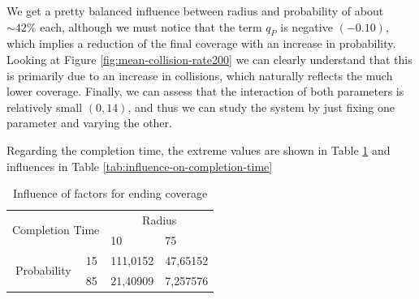 We get a pretty balanced influence between radius and probability of about $\sim 42\%$ each, although we must notice that the term $q_P$ is negative $(-0.10)$, which implies a reduction of the final coverage with an increase in probability. Looking at Figure \ref{fig:mean-collision-rate200} we can clearly understand that this is primarily due to an increase in collisions, which naturally reflects the much lower coverage. Finally, we can assess that the interaction of both parameters is relatively small $(0,14)$, and thus we can study the system by just fixing one parameter and varying the other.

Regarding the completion time, the extreme values are shown in Table \ref{tab:extreme-factors-on-completion-time} and influences in Table \ref{tab:influence-on-completion-time}

\begin{table}[H]
\centering
\begin{tabular}{|cl|rr|}
\hline
\multicolumn{2}{|c|}{\multirow{2}{*}{Completion Time}}  & \multicolumn{2}{c|}{Radius}                             \\ \cline{3-4} 
\multicolumn{2}{|c|}{}                                  & \multicolumn{1}{l|}{10}       & \multicolumn{1}{l|}{75} \\ \hline
\multicolumn{1}{|c|}{\multirow{2}{*}{Probability}} & 15 & \multicolumn{1}{r|}{111,0152} & 47,65152                \\ \cline{2-4} 
\multicolumn{1}{|c|}{}                             & 85 & \multicolumn{1}{r|}{21,40909} & 7,257576                \\ \hline
\end{tabular}
\caption{Influence of factors for ending coverage}
\label{tab:extreme-factors-on-completion-time}
\end{table}

